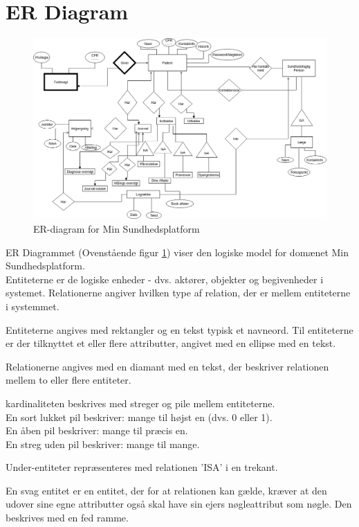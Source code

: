 \section{ER Diagram}
\begin{figure}[H]
  \includegraphics[width=\linewidth]{Materials/ER-diagram.png}
  \caption{ER-diagram for Min Sundhedsplatform}
  \label{fig:ER}
\end{figure}
ER Diagrammet (Ovenstående figur \ref{fig:ER}) viser den logiske model for domænet Min Sundhedsplatform. \\
Entiteterne er de logiske enheder - dvs. aktører, objekter og begivenheder i systemet. 
Relationerne angiver hvilken type af relation, der er mellem entiteterne i systemmet.

Entiteterne angives med rektangler og en tekst typisk et navneord. Til entiteterne er der tilknyttet et eller flere attributter, angivet med en ellipse med en tekst.

Relationerne angives med en diamant med en  tekst, der beskriver relationen mellem to eller flere entiteter.

kardinaliteten beskrives med streger og pile mellem entiteterne. \\ 
En sort lukket pil beskriver: mange til højst en (dvs. 0 eller 1).\\
En åben pil beskriver: mange til præcis en.\\
En streg uden pil beskriver: mange til mange.

Under-entiteter repræsenteres med relationen 'ISA' i en trekant.

En svag entitet er en entitet, der for at relationen kan gælde, kræver at den udover sine egne attributter også skal have sin ejers nøgleattribut som nøgle. Den beskrives med en fed ramme.

